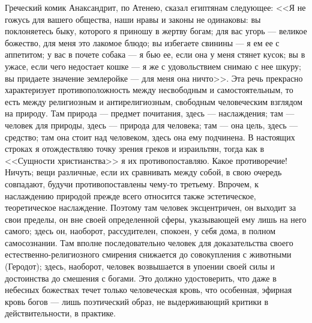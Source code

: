 \documentclass[12pt,oneside]{book}
\begin{document}
Греческий комик Анаксандрит, по Атенею, сказал египтянам следующее: <<Я не гожусь для вашего общества, наши нравы и законы не одинаковы: вы поклоняетесь быку, которого я приношу в жертву богам; для вас угорь --- великое божество, для меня это лакомое блюдо; вы избегаете свинины --- я ем ее с аппетитом; у вас в почете собака --- я бью ее, если она у меня стянет кусок; вы в ужасе, если чего недостает кошке --- я же с удовольствием снимаю с нее шкуру; вы придаете значение землеройке --- для меня она ничто>>. Эта речь прекрасно характеризует противоположность между несвободным и самостоятельным, то есть между религиозным и антирелигиозным, свободным человеческим взглядом на природу. Там природа --- предмет почитания, здесь --- наслаждения; там --- человек для природы, здесь --- природа для человека; там --- она цель, здесь --- средство; там она стоит над человеком, здесь она ему подчинена. В настоящих строках я отождествляю точку зрения греков и израильтян, тогда как в <<Сущности христианства>> я их противопоставляю. Какое противоречие! Ничуть; вещи различные, если их сравнивать между собой, в свою очередь совпадают, будучи противопоставлены чему-то третьему. Впрочем, к наслаждению природой прежде всего относится также эстетическое, теоретическое наслаждение. Поэтому там человек эксцентричен, он выходит за свои пределы, он вне своей определенной сферы, указывающей ему лишь на него самого; здесь он, наоборот, рассудителен, спокоен, у себя дома, в полном самосознании. Там вполне последовательно человек для доказательства своего естественно-религиозного смирения снижается до совокупления с животными (Геродот); здесь, наоборот, человек возвышается в упоении своей силы и достоинства до смешения с богами. Это должно удостоверить, что даже в небесных божествах течет только человеческая кровь, что особенная, эфирная кровь богов --- лишь поэтический образ, не выдерживающий критики в действительности, в практике.



\chapter{}
\end{document}
